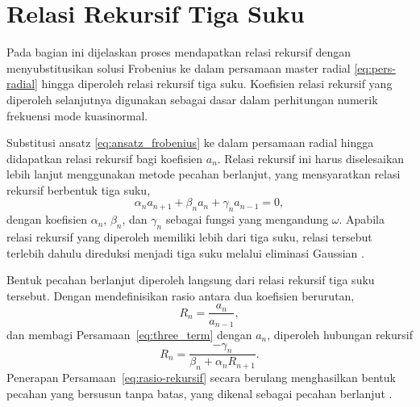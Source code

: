 \section{Relasi Rekursif Tiga Suku}
\label{sec:rekurensi}

Pada bagian ini dijelaskan proses mendapatkan relasi rekursif dengan menyubstitusikan solusi Frobenius ke dalam persamaan master radial \eqref{eq:pers-radial} hingga diperoleh relasi rekursif tiga suku. Koefisien relasi rekursif yang diperoleh selanjutnya digunakan sebagai dasar dalam perhitungan numerik frekuensi mode kuasinormal.

\noindent Substitusi ansatz \eqref{eq:ansatz_frobenius} ke dalam persamaan radial hingga didapatkan relasi
rekursif bagi koefisien $a_n$. Relasi rekursif ini harus diselesaikan lebih lanjut
menggunakan metode pecahan berlanjut, yang mensyaratkan relasi rekursif berbentuk tiga suku,
\begin{equation}
    \alpha_n a_{n+1} + \beta_n a_n + \gamma_n a_{n-1} = 0,
    \label{eq:three_term}
\end{equation}
dengan koefisien $\alpha_n$, $\beta_n$, dan $\gamma_n$ sebagai fungsi yang mengandung
$\omega$. Apabila relasi rekursif yang diperoleh memiliki lebih dari tiga suku, relasi
tersebut terlebih dahulu direduksi menjadi tiga suku melalui eliminasi Gaussian
\parencite{Leaver1985, Konoplya2011}.

Bentuk pecahan berlanjut diperoleh langsung dari relasi rekursif tiga suku tersebut.
Dengan mendefinisikan rasio antara dua koefisien berurutan,
\begin{equation}
    R_n = \frac{a_n}{a_{n-1}},
\end{equation}
dan membagi Persamaan~\eqref{eq:three_term} dengan $a_n$, diperoleh hubungan rekursif
\begin{equation}
    R_n = \frac{-\gamma_n}{\beta_n + \alpha_n R_{n+1}}.
    \label{eq:rasio-rekursif}
\end{equation}
Penerapan Persamaan~\eqref{eq:rasio-rekursif} secara berulang menghasilkan bentuk pecahan
yang bersusun tanpa batas, yang dikenal sebagai pecahan berlanjut \parencite{Leaver1985}.

